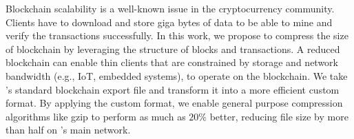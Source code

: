 Blockchain scalability is a well-known issue in the cryptocurrency community.
Clients have to download and store giga bytes of data to be able to mine and verify the transactions successfully.
In this work, we propose to compress the size of \eth{} blockchain by leveraging the structure of blocks and transactions.
A reduced blockchain can enable thin clients  that are constrained by storage and network bandwidth (e.g., IoT, embedded systems),
to operate on the \eth{} blockchain. We take \eth{}'s standard blockchain export file and transform it into a more
efficient custom format. By applying the custom format, we enable general purpose compression algorithms like gzip to perform
as much as $20\%$ better, reducing file size by more than half on \eth{}'s main network.
